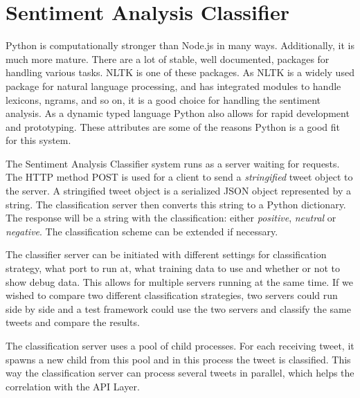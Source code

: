 \section{Sentiment Analysis Classifier}

Python is computationally stronger than Node.js in many ways. Additionally, it is much more mature. There are a lot of stable, well documented, packages for handling various tasks. NLTK is one of these packages. As NLTK is a widely used package for natural language processing, and has integrated modules to handle lexicons, ngrams, and so on, it is a good choice for handling the sentiment analysis. As a dynamic typed language Python also allows for rapid development and prototyping. These attributes are some of the reasons Python is a good fit for this system. 

The Sentiment Analysis Classifier system runs as a server waiting for requests. The HTTP method POST is used for a client to send a \textit{stringified} tweet object to the server. A stringified tweet object is a serialized JSON object represented by a string. The classification server then converts this string to a Python dictionary. The response will be a string with the classification: either \textit{positive}, \textit{neutral} or \textit{negative}. The classification scheme can be extended if necessary. 

The classifier server can be initiated with different settings for classification strategy, what port to run at, what training data to use and whether or not to show debug data. This allows for multiple servers running at the same time. If we wished to compare two different classification strategies, two servers could run side by side and a test framework could use the two servers and classify the same tweets and compare the results.

The classification server uses a pool of child processes. For each receiving tweet, it spawns a new child from this pool and in this process the tweet is classified. This way the classification server can process several tweets in parallel, which helps the correlation with the API Layer.



